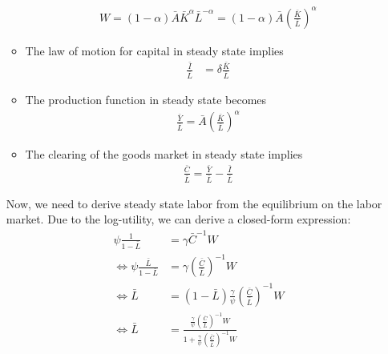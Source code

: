 \begin{enumerate}
\begin{solution}
\begin{itemize}
\begin{align*}
                            W =(1-\alpha) \bar{A}\bar{K}^\alpha \bar{L}^{-\alpha} = (1-\alpha)\bar{A} \left(\frac{\bar{K}}{\bar{L}}\right)^\alpha
                        \end{align*}
                  \item The law of motion for capital in steady state implies
                        \begin{align*}
                            \frac{\bar{I}}{\bar{L}} & = \delta\frac{\bar{K}}{\bar{L}}
                        \end{align*}
                  \item The production function in steady state becomes
                        \begin{align*}
                            \frac{\bar{Y}}{\bar{L}} = \bar{A} \left(\frac{\bar{K}}{\bar{L}}\right)^\alpha
                        \end{align*}
                  \item The clearing of the goods market in steady state implies
                        \begin{align*}
                            \frac{\bar{C}}{\bar{L}} = \frac{\bar{Y}}{\bar{L}} - \frac{\bar{I}}{\bar{L}}
                        \end{align*}
              \end{itemize}
              Now, we need to derive steady state labor from the equilibrium on the labor market. Due to the log-utility, we can derive a closed-form expression:
              \begin{align*}
                  \psi \frac{1}{1-\bar{L}}                       & = \gamma \bar{C}^{-1} W                                                                                                                     \\
                  \Leftrightarrow \psi \frac{\bar{L}}{1-\bar{L}} & = \gamma \left(\frac{\bar{C}}{\bar{L}}\right)^{-1} W                                                                                        \\
                  \Leftrightarrow \bar{L}                        & = (1-\bar{L})\frac{\gamma}{\psi} \left(\frac{\bar{C}}{\bar{L}}\right)^{-1} W                                                                \\
                  \Leftrightarrow \bar{L}                        & = \frac{\frac{\gamma}{\psi} \left(\frac{\bar{C}}{\bar{L}}\right)^{-1} W}{1+\frac{\gamma}{\psi} \left(\frac{\bar{C}}{\bar{L}}\right)^{-1} W} \\

\end{align*}
\end{solution}
\end{enumerate}

